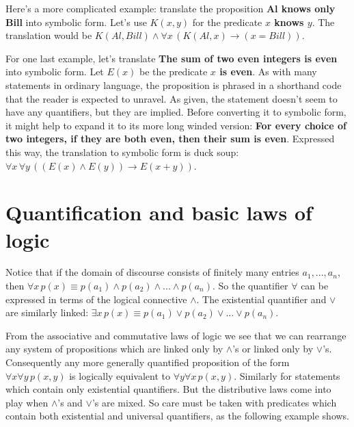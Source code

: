 \begin{exmp}\label{exmp:Al knows}
Here's a more complicated example: translate the proposition \textbf{Al 
knows only Bill} into symbolic form. Let's use $K(x,y)$ for the predicate \textbf{$x$ knows
$y$}. The translation would be $K(Al,Bill)\land \forall x\,(K(Al,x)\to (x=Bill))$.
\end{exmp}

\begin{exmp}\label{exmp:sum of evens}
For one last example, let's translate \textbf{The sum of two even integers is even}
into symbolic form. Let $E(x)$ be the predicate \textbf{$x$ is even}. As with many statements
in ordinary language, the proposition is phrased in a shorthand code that the reader is 
expected to unravel. As
given, the statement doesn't seem to have any quantifiers, but they are implied. 
Before converting it to symbolic form, it might help to expand it to its more long winded version:
\textbf{For every choice of two integers, if they are both
even, then their sum is even}. Expressed this way, the translation to symbolic 
form is duck soup:
$\forall x\,\forall y\, ((E(x)\land E(y))\to E(x+y))$.
\end{exmp}

\section{Quantification and basic laws of logic}
Notice  that if the domain of discourse consists of finitely many entries $a_1, ..., a_n$,
then $\forall x\, p(x)\equiv p(a_1)\wedge p(a_2) \wedge ... \wedge p(a_n)$. 
So the quantifier $\forall$ can be expressed in terms of the logical connective $\wedge$. 
The existential quantifier and $\vee$ are similarly linked: 
$\exists x\, p(x)\equiv p(a_1)\lor p(a_2) \lor ... \lor p(a_n)$.

From the associative and commutative laws of logic  we see that we can rearrange any system of propositions which
are linked only by $\wedge$'s or linked only by $\vee$'s. Consequently any more generally 
quantified proposition of the form $\forall x\forall y\, p(x,y)$ is logically equivalent 
to $\forall y \forall x\, p(x,y)$.
Similarly for statements which contain only existential quantifiers. But the distributive 
laws come into play when $\wedge$'s and $\vee$'s are mixed. So care must be taken with
predicates  which contain both existential and universal quantifiers, as the following example shows.

